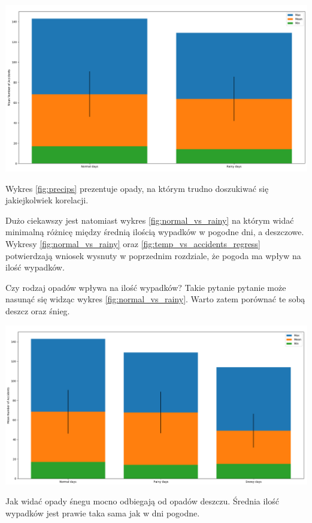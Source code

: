 \documentclass{article}
\begin{document}
 \begin{center}
    \includegraphics[scale=0.3]{visualization/normal_vs_rainy.png}
    \captionsetup{hypcap=false}
    \label{fig:normal_vs_rainy}
\end{center}

Wykres \ref{fig:precips} prezentuje opady, na którym trudno doszukiwać się jakiejkolwiek korelacji.

Dużo ciekawszy jest natomiast wykres \ref{fig:normal_vs_rainy} na którym widać minimalną różnicę między średnią ilością wypadków w pogodne dni, a deszczowe.
Wykresy \ref{fig:normal_vs_rainy} oraz \ref{fig:temp_vs_accidents_regress} potwierdzają wniosek wysnuty w poprzednim rozdziale, że pogoda ma wpływ na ilość wypadków.

Czy rodzaj opadów wpływa na ilość wypadków? Takie pytanie pytanie może nasunąć się widząc wykres \ref{fig:normal_vs_rainy}. Warto zatem porównać te sobą deszcz oraz śnieg.

 \begin{center}
    \includegraphics[scale=0.3]{visualization/rain_vs_snow.png}
    \captionsetup{hypcap=false}
    \label{fig:normal_vs_rainy}
\end{center}
Jak widać opady śnegu mocno odbiegają od opadów deszczu. Średnia ilość wypadków jest prawie taka sama jak w dni pogodne. 
\end{document}
